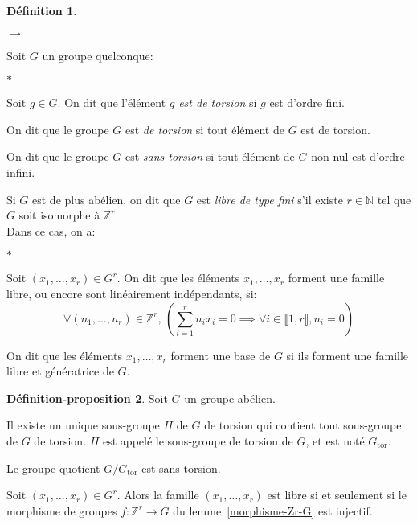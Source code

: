 \documentclass{article}
\newcommand{\Z}{\mathbb{Z}}
\newcommand{\N}{\mathbb{N}}
\newcommand{\Gt}{G_{\mathrm{tor}}}
\newcommand{\dis}{\displaystyle}
\newenvironment{ls}{\begin{list}{$\to$}{}}{\end{list}}
\newenvironment{lls}{\begin{list}{$\ast$}{}}{\end{list}}
\newcommand{\nt}[1]{\llbracket  #1 \rrbracket }
\theoremstyle{definition}
\newtheorem{defi}{Définition}[section]
\newtheorem{depro}[defi]{Définition-proposition}
\theoremstyle{remark}
\begin{document}
\begin{defi}\hspace{.1em}
\begin{ls}
\item Soit $G$ un groupe quelconque:
\begin{lls}
\item Soit $g \in G$. On dit que l'élément $g$ \textit{est de torsion} si $g$ est d'ordre fini.
\item On dit que le groupe $G$ est \textit{de torsion} si tout élément de $G$ est de torsion.
\item On dit que le groupe $G$ est \textit{sans torsion} si tout élément de $G$ non nul est d'ordre infini.
\end{lls}

\item Si $G$ est de plus abélien, on dit que $G$ est \textit{libre de type fini} s'il existe $r \in \N$ tel que $G$ soit isomorphe à $\Z^r$.\\
Dans ce cas, on a:
\begin{lls}
\item Soit $(x_1, \ldots, x_r) \in G^r$.  On dit que les éléments $x_1, \ldots, x_r$ forment une famille libre, ou encore sont linéairement indépendants, si:
$$\forall (n_1, \ldots, n_r) \in \Z^r,\, \left(\dis \sum_{i=1}^r n_ix_i=0\implies\forall i \in \nt{1,r}, n_i=0\right)$$
\item On dit que les éléments $x_1, \ldots, x_r$ forment une base de $G$ si ils forment une famille libre et génératrice de $G$.
\end{lls}
\end{ls}
\end{defi}

\begin{depro}\label{def-groupe-torsion}
Soit $G$ un groupe abélien.
\begin{point}
\item Il existe un unique sous-groupe $H$ de $G$ de torsion qui contient tout sous-groupe de $G$ de torsion. $H$ est appelé le sous-groupe de torsion de $G$, et est noté $\Gt$.
\item Le groupe quotient $G/\Gt$ est sans torsion.
\item Soit $(x_1, \ldots, x_r)  \in G^r$. Alors la famille  $(x_1, \ldots, x_r)$ est libre si et seulement si le morphisme de groupes $f:\Z^r\to G$ du lemme~\ref{morphisme-Zr-G} est injectif.
\end{point}
\end{depro}
\end{document}
